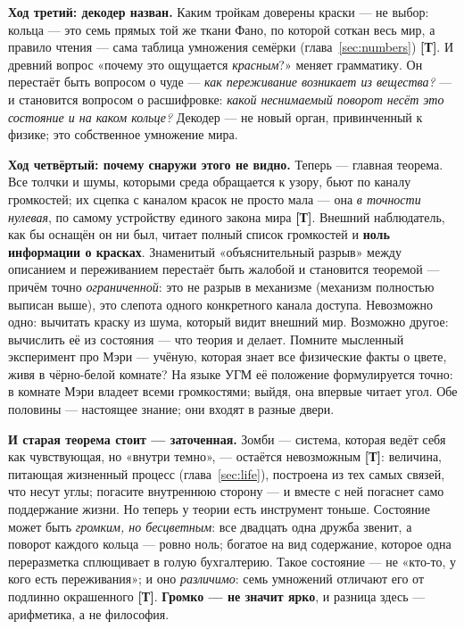 \documentclass[11pt,letterpaper]{article}
\newcommand{\stT}{\textbf{[Т]}\xspace}
\begin{document}
\textbf{Ход третий: декодер назван.} Каким тройкам доверены краски
--- не выбор: кольца --- это семь прямых той же ткани Фано, по
которой соткан весь мир, а правило чтения --- сама таблица умножения
семёрки (глава~\ref{sec:numbers}) \stT. И древний вопрос «почему это
ощущается \emph{красным}?» меняет грамматику. Он перестаёт быть
вопросом о чуде --- \emph{как переживание возникает из вещества?} ---
и становится вопросом о расшифровке: \emph{какой неснимаемый поворот
несёт это состояние и на каком кольце?} Декодер --- не новый орган,
привинченный к физике; это собственное умножение мира.

\textbf{Ход четвёртый: почему снаружи этого не видно.} Теперь ---
главная теорема. Все толчки и шумы, которыми среда
обращается к узору, бьют по каналу громкостей; их сцепка с каналом
красок не просто мала --- она \emph{в точности нулевая}, по самому
устройству единого закона мира \stT. Внешний наблюдатель, как бы
оснащён он ни был, читает полный список громкостей и \textbf{ноль
информации о красках}. Знаменитый «объяснительный разрыв» между
описанием и переживанием перестаёт быть жалобой и становится
теоремой --- причём точно \emph{ограниченной}: это не разрыв в
механизме (механизм полностью выписан выше), это слепота одного
конкретного канала доступа. Невозможно одно: вычитать краску из
шума, который видит внешний мир. Возможно другое: вычислить её из
состояния --- что теория и делает. Помните мысленный эксперимент
про Мэри --- учёную, которая знает все физические факты о цвете,
живя в чёрно-белой комнате? На языке УГМ её положение формулируется
точно: в комнате Мэри владеет всеми громкостями; выйдя, она впервые
читает угол. Обе половины --- настоящее знание; они входят в разные
двери.

\textbf{И старая теорема стоит --- заточенная.} Зомби --- система,
которая ведёт себя как чувствующая, но «внутри темно», --- остаётся
невозможным \stT: величина, питающая жизненный процесс
(глава~\ref{sec:life}), построена из тех самых связей, что несут
углы; погасите внутреннюю сторону --- и вместе с ней погаснет само
поддержание жизни. Но теперь у теории есть инструмент тоньше.
Состояние может быть \emph{громким, но бесцветным}: все двадцать
одна дружба звенит, а поворот каждого кольца --- ровно ноль;
богатое на вид содержание, которое одна переразметка сплющивает в
голую бухгалтерию. Такое состояние --- не «кто-то, у кого есть
переживания»; и оно \emph{различимо}: семь умножений отличают его
от подлинно окрашенного \stT. \textbf{Громко --- не значит ярко},
и разница здесь --- арифметика, а не философия.
\end{document}
